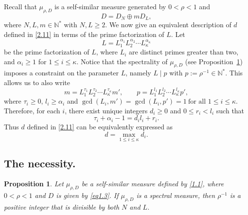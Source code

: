 \documentclass[11pt]{article}
\newtheorem{proposition}[theorem]{Proposition}
\numberwithin{equation}{section}
\begin{document}
Recall that $\mu_{\rho,D}$ is a self-similar measure generated by $0<\rho<1$ and
\[
D = D_N \oplus m D_L,
\]
where $N,L,m \in \mathbb{N}^*$ with $N,L \ge 2$.
We now give an equivalent description of  $d$ defined in \eqref{2.11}
in terms of the prime factorization of $L$.
Let
\begin{equation}\label{3.5}
	L = L_1^{\alpha_1} L_2^{\alpha_2} \cdots L_\kappa^{\alpha_\kappa}
\end{equation}
be the prime factorization of $L$, where $L_i$ are distinct primes greater than two, and
$\alpha_i \ge 1$ for $1 \le i \le \kappa$. 
Notice that the spectrality of $\mu_{\rho,D}$
(see Proposition~\ref{pro1.1}) imposes a constraint on the parameter $L$, namely $L \mid p$ with $p := \rho^{-1} \in \mathbb{N}^*$. This allows us to also write
\begin{equation}\label{3.6}
	m = L_1^{\tau_1} L_2^{\tau_2} \cdots L_\kappa^{\tau_\kappa} m',
	\qquad
	p = L_1^{l_1} L_2^{l_2} \cdots L_\kappa^{l_\kappa} p',
\end{equation}
where $\tau_i\geq 0$, $l_i\ge \alpha_i$ and
$
\gcd(L_i,m') = \gcd(L_i,p') = 1
~ \text{for all } 1 \le i \le \kappa.
$ 
 Therefore, 
for each $ i $, there exist unique integers $d_i \ge 0$
and $0 \le r_i < l_i$ such that
\begin{equation}\label{3.7}
	\tau_i + \alpha_i - 1 = d_i l_i + r_i .
\end{equation}
Thus $d$ defined in \eqref{2.11} can be equivalently expressed as
\begin{equation}\label{eq3.1.0}
	d = \max_{1 \le i \le \kappa} d_i .
\end{equation}


\vspace{-0.5cm}
\subsection{The necessity.}
\begin{proposition}\label{pro1.1}
Let $\mu_{\rho,D}$ be a self-similar measure defined by \eqref{1.1}, where
$0<\rho<1$ and $D$ is given by \eqref{eq1.3}.
If $\mu_{\rho,D}$ is a spectral measure, then $\rho^{-1}$ is a positive integer that is divisible by both $N$ and $L$.
\end{proposition}
\end{document}
